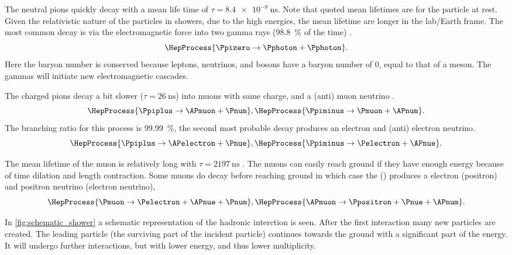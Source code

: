 The neutral pions quickly decay with a mean life time of $\tau = \SI{8.4e-8}{\ns}$.  Note that quoted mean lifetimes are for the particle at rest. Given the relativistic nature of the particles in showers, due to the high energies, the mean lifetime are longer in the lab/Earth frame. The most common decay is via the electromagnetic force into two gamma rays (\SI{98.8}{\percent} of the time) \cite{olive2014pdg}.
%
\begin{equation}
    \HepProcess{\Ppizero \to \Pphoton + \Pphoton}.
\end{equation}
%
Here the baryon number is conserved because leptons, neutrinos, and bosons have a baryon number of 0, equal to that of a meson. The gammas will initiate new electromagnetic cascades.

The charged pions decay a bit slower ($\tau = \SI{26}{\ns}$) into muons with same charge, and a (anti) muon neutrino \cite{olive2014pdg}.
%
\begin{equation}
    \HepProcess{\Ppiplus \to \APmuon + \Pnum},
    \HepProcess{\Ppiminus \to \Pmuon + \APnum}.
\end{equation}
%
The branching ratio for this process is \SI{99.99}{\percent}, the second most probable decay produces an electron and (anti) electron neutrino.
%
\begin{equation}
    \HepProcess{\Ppiplus \to \APelectron + \Pnue},
    \HepProcess{\Ppiminus \to \Pelectron + \APnue}.
\end{equation}

The mean lifetime of the muon is relatively long with $\tau = \SI{2197}{\ns}$ \cite{duclos1973muon}. The muons can easily reach ground if they have enough energy because of time dilation and length contraction. Some muons do decay before reaching ground in which case the \Pmuon (\APmuon) produces a electron (positron) and positron neutrino (electron neutrino),
%
\begin{equation}
    \HepProcess{\Pmuon \to \Pelectron + \APnue + \Pnum}, \\
    \HepProcess{\APmuon \to \Ppositron + \Pnue + \APnum}.
\end{equation}

In \cref{fig:schematic_shower} a schematic representation of the hadronic interction is seen. After the first interaction many new particles are created. The leading particle (the surviving part of the incident particle) continues towards the ground with a significant part of the energy. It will undergo further interactions, but with lower energy, and thus lower multiplicity.

